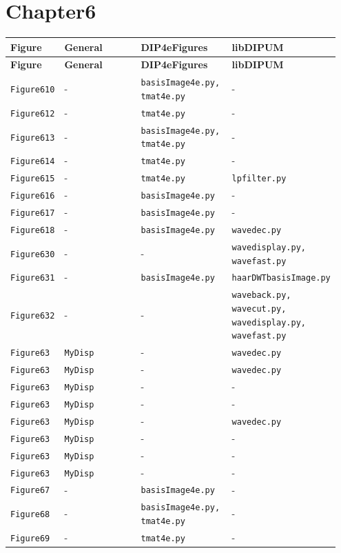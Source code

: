\documentclass[10pt]{article}
\begin{document}
\section*{Chapter6}
\setlength{\tabcolsep}{4pt}
\begin{longtable}{p{0.11\linewidth} p{0.28\linewidth} p{0.28\linewidth} p{0.28\linewidth}}
\toprule
\textbf{Figure} & \textbf{General} & \textbf{DIP4eFigures} & \textbf{libDIPUM} \\
\midrule
\endfirsthead
\toprule
\textbf{Figure} & \textbf{General} & \textbf{DIP4eFigures} & \textbf{libDIPUM} \\
\midrule
\endhead
\bottomrule
\endfoot
\texttt{Figure610} & - & \texttt{basisImage4e.py, tmat4e.py} & - \\
\texttt{Figure612} & - & \texttt{tmat4e.py} & - \\
\texttt{Figure613} & - & \texttt{basisImage4e.py, tmat4e.py} & - \\
\texttt{Figure614} & - & \texttt{tmat4e.py} & - \\
\texttt{Figure615} & - & \texttt{tmat4e.py} & \texttt{lpfilter.py} \\
\texttt{Figure616} & - & \texttt{basisImage4e.py} & - \\
\texttt{Figure617} & - & \texttt{basisImage4e.py} & - \\
\texttt{Figure618} & - & \texttt{basisImage4e.py} & \texttt{wavedec.py} \\
\texttt{Figure630} & - & - & \texttt{wavedisplay.py, wavefast.py} \\
\texttt{Figure631} & - & \texttt{basisImage4e.py} & \texttt{haarDWTbasisImage.py} \\
\texttt{Figure632} & - & - & \texttt{waveback.py, wavecut.py, wavedisplay.py, wavefast.py} \\
\texttt{Figure63} & \texttt{MyDisp} & - & \texttt{wavedec.py} \\
\texttt{Figure63} & \texttt{MyDisp} & - & \texttt{wavedec.py} \\
\texttt{Figure63} & \texttt{MyDisp} & - & - \\
\texttt{Figure63} & \texttt{MyDisp} & - & - \\
\texttt{Figure63} & \texttt{MyDisp} & - & \texttt{wavedec.py} \\
\texttt{Figure63} & \texttt{MyDisp} & - & - \\
\texttt{Figure63} & \texttt{MyDisp} & - & - \\
\texttt{Figure63} & \texttt{MyDisp} & - & - \\
\texttt{Figure67} & - & \texttt{basisImage4e.py} & - \\
\texttt{Figure68} & - & \texttt{basisImage4e.py, tmat4e.py} & - \\
\texttt{Figure69} & - & \texttt{tmat4e.py} & - \\
\end{longtable}
\end{document}
